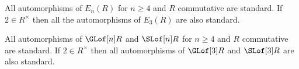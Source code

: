 \bthrm

    All automorphisms of $E_n(R)$ for $n\geq4$ and $R$ commutative are standard.
    If $2\in R^\times$ then all the automorphisms of $E_3(R)$ are also standard.

\ethrm

\bthrm

    All automorphisms of $\GLof[n]R$ and $\SLof[n]R$ for $n\geq4$ and $R$ commutative are standard.
    If $2\in R^\times$ then all automorphisms of $\GLof[3]R$ and $\SLof[3]R$ are also standard.

\ethrm

\bye

